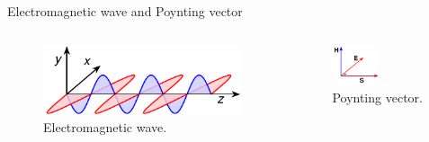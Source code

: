 \begin{frame}{Electromagnetic wave and Poynting vector}
\begin{columns}
    \vspace{-6mm}
    \begin{figure}
        \centering
        \includegraphics[width=\textwidth]{Figures/Electromagnetic_wave.pdf}
        \caption{Electromagnetic wave.}
        \label{fig:Electromagnetic_wave}
    \end{figure}
    \vspace{-2mm}
    \begin{figure}
        \centering
        \includegraphics[width=0.5\textwidth]{Figures/Poynting_vector.pdf}
        \caption{Poynting vector.}
        \label{fig:Poynting_vector}
    \end{figure}


    \end{columns}
\end{frame}